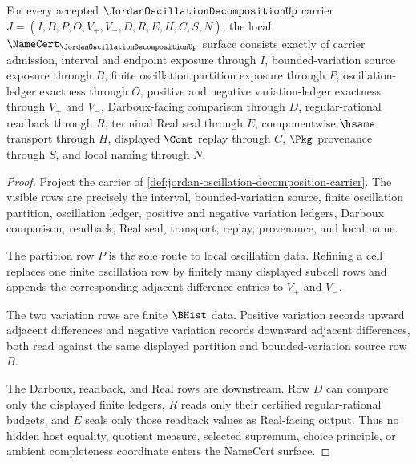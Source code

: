 \begin{theorem}
\label{thm:jordan-oscillation-decomposition-namecert-obligations}
For every accepted $\JordanOscillationDecompositionUp$ carrier $J=(I,B,P,O,V_{+},V_{-},D,R,E,H,C,S,N)$, the local $\NameCert_{\JordanOscillationDecompositionUp}$ surface consists exactly of carrier admission, interval and endpoint exposure through $I$, bounded-variation source exposure through $B$, finite oscillation partition exposure through $P$, oscillation-ledger exactness through $O$, positive and negative variation-ledger exactness through $V_{+}$ and $V_{-}$, Darboux-facing comparison through $D$, regular-rational readback through $R$, terminal Real seal through $E$, componentwise $\hsame$ transport through $H$, displayed $\Cont$ replay through $C$, $\Pkg$ provenance through $S$, and local naming through $N$.
\end{theorem}
\begin{proof}
Project the carrier of \autoref{def:jordan-oscillation-decomposition-carrier}. The visible rows are precisely the interval, bounded-variation source, finite oscillation partition, oscillation ledger, positive and negative variation ledgers, Darboux comparison, readback, Real seal, transport, replay, provenance, and local name.

The partition row $P$ is the sole route to local oscillation data. Refining a cell replaces one finite oscillation row by finitely many displayed subcell rows and appends the corresponding adjacent-difference entries to $V_{+}$ and $V_{-}$.

The two variation rows are finite $\BHist$ data. Positive variation records upward adjacent differences and negative variation records downward adjacent differences, both read against the same displayed partition and bounded-variation source row $B$.

The Darboux, readback, and Real rows are downstream. Row $D$ can compare only the displayed finite ledgers, $R$ reads only their certified regular-rational budgets, and $E$ seals only those readback values as Real-facing output. Thus no hidden host equality, quotient measure, selected supremum, choice principle, or ambient completeness coordinate enters the NameCert surface.
\end{proof}

